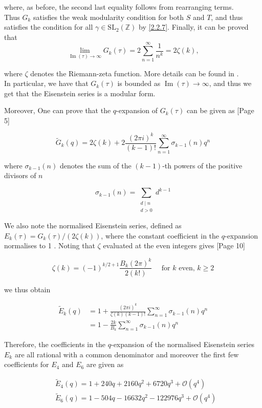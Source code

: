 where, as before, the second last equality follows from rearranging terms.\\
Thus $G_{k}$ satisfies the weak modularity condition for both $S$ and $T$, and thus satisfies the condition for all $\gamma \in \mathrm{SL}_{2}(\mathbb{Z})$ by \ref{2.2.7}.
Finally, it can be proved that 
$$
\lim _{\operatorname{Im}(\tau) \rightarrow \infty} G_{k}(\tau)=2 \sum_{n=1}^{\infty} \frac{1}{n^{k}}=2 \zeta(k),
$$

where $\zeta$ denotes the Riemann-zeta function. More details can be found in \cite{diamond2005first}. \\ In particular, we have that $G_{k}(\tau)$ is bounded as $\operatorname{Im}(\tau) \rightarrow \infty$, and thus we get that the Eisenstein series is a modular form. 

Moreover, One can prove that the $q$-expansion of $G_{k}(\tau)$ can be given as \cite{diamond2005first}[Page 5]

$$
\tilde{G}_{k}(q)=2 \zeta(k)+2 \frac{(2 \pi i)^{k}}{(k-1) !} \sum_{n=1}^{\infty} \sigma_{k-1}(n) q^{n}
$$

where $\sigma_{k-1}(n)$ denotes the sum of the $(k-1)$-th powers of the positive divisors of $n$

$$
\sigma_{k-1}(n)=\sum_{\substack{d \mid n \\ d>0}} d^{k-1}
$$

We also note the normalised Eisenstein series, defined as $E_{k}(\tau)=G_{k}(\tau) /(2 \zeta(k))$, where the constant coefficient in the $q$-expansion normalises to 1 . Noting that $\zeta$ evaluated at the even integers gives \cite{diamond2005first}[Page 10]

$$
\zeta(k)=(-1)^{k / 2+1} \frac{B_{k}(2 \pi)^{k}}{2(k !)} \quad \text { for } k \text { even, } k \geq 2
$$

we thus obtain

$$
\begin{aligned}
\tilde{E}_{k}(q) & =1+\frac{(2 \pi i)^{k}}{\zeta(k)(k-1) !} \sum_{n=1}^{\infty} \sigma_{k-1}(n) q^{n} \\
& =1-\frac{2 k}{B_{k}} \sum_{n=1}^{\infty} \sigma_{k-1}(n) q^{n}
\end{aligned}
$$

Therefore, the coefficients in the $q$-expansion of the normalised Eisenstein series $E_{k}$ are all rational with a common denominator and moreover the first few coefficients for $E_{4}$ and $E_{6}$ are given as

$$
\begin{aligned}
& \tilde{E}_{4}(q)=1+240 q+2160 q^{2}+6720 q^{3}+\mathcal{O}\left(q^{4}\right) \\
& \tilde{E}_{6}(q)=1-504 q-16632 q^{2}-122976 q^{3}+\mathcal{O}\left(q^{4}\right)
\end{aligned}
$$


